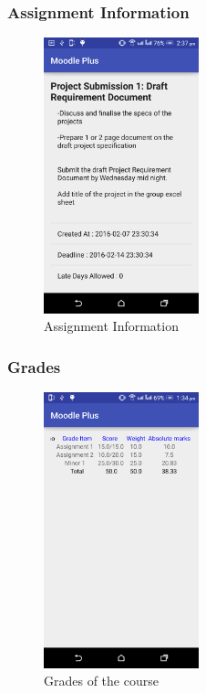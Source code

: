 \documentclass[12pt]{article}
\begin{document}
\subsubsection{Assignment Information}
\begin{figure}[!ht]
	\centering
	\includegraphics[width=0.4\textwidth]{images/ass_info.png}
	\caption{Assignment Information}
\end{figure}
\FloatBarrier
\subsubsection{Grades}
\begin{figure}[!ht]
	\centering
	\includegraphics[width=0.4\textwidth]{images/course_grades.png}
	\caption{Grades of the course}
\end{figure}
\FloatBarrier
\end{document}
